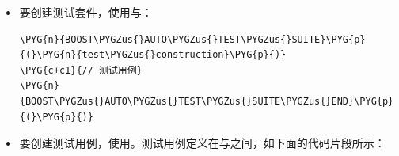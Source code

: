 \begin{itemize}
\item 要创建测试套件，使用与：



\begin{codeblockbg}
\begin{Verbatim}[commandchars=\\\{\},breaklines=true,breakanywhere=true,fontsize=\codefont,xleftmargin=17bp]
\PYG{n}{BOOST\PYGZus{}AUTO\PYGZus{}TEST\PYGZus{}SUITE}\PYG{p}{(}\PYG{n}{test\PYGZus{}construction}\PYG{p}{)}
\PYG{c+c1}{// 测试用例}
\PYG{n}{BOOST\PYGZus{}AUTO\PYGZus{}TEST\PYGZus{}SUITE\PYGZus{}END}\PYG{p}{(}\PYG{p}{)}
\end{Verbatim}
\end{codeblockbg}



\item 要创建测试用例，使用。测试用例定义在与之间，如下面的代码片段所示：




\end{itemize}
